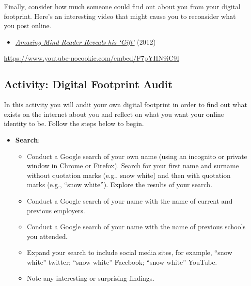 \documentclass[
  letterpaper,
  DIV=11,
  numbers=noendperiod]{scrreprt}
\providecommand{\tightlist}{%
  \setlength{\itemsep}{0pt}\setlength{\parskip}{0pt}}\usepackage{longtable,booktabs,array}
\begin{document}
\begin{tcolorbox}
Finally, consider how much someone could find out about you from your
digital footprint. Here's an interesting video that might cause you to
reconsider what you post online.

\begin{itemize}
\tightlist
\item
  \href{https://www.youtube.com/watch?v=F7pYHN9iC9I}{\emph{Amazing Mind
  Reader Reveals his `Gift'}} (2012)
\end{itemize}

\url{https://www.youtube-nocookie.com/embed/F7pYHN9iC9I}

\end{tcolorbox}

\subsection{Activity: Digital Footprint
Audit}\label{activity-digital-footprint-audit}

\begin{tcolorbox}[enhanced jigsaw, toprule=.15mm, colback=white, colframe=quarto-callout-note-color-frame, bottomtitle=1mm, leftrule=.75mm, coltitle=black, titlerule=0mm, rightrule=.15mm, colbacktitle=quarto-callout-note-color!10!white, left=2mm, title={Learning Activity}, opacitybacktitle=0.6, opacityback=0, breakable, toptitle=1mm, arc=.35mm, bottomrule=.15mm]

In this activity you will audit your own digital footprint in order to
find out what exists on the internet about you and reflect on what you
want your online identity to be. Follow the steps below to begin.

\begin{itemize}
\tightlist
\item
  \textbf{Search}:

  \begin{itemize}
  \tightlist
  \item
    Conduct a Google search of your own name (using an incognito or
    private window in Chrome or Firefox). Search for your first name and
    surname without quotation marks (e.g., snow white) and then with
    quotation marks (e.g., ``snow white''). Explore the results of your
    search.
  \item
    Conduct a Google search of your name with the name of current and
    previous employers.
  \item
    Conduct a Google search of your name with the name of previous
    schools you attended.
  \item
    Expand your search to include social media sites, for example,
    ``snow white'' twitter; ``snow white'' Facebook; ``snow white''
    YouTube.
  \item
    Note any interesting or surprising findings.
  \end{itemize}
\end{itemize}

\end{tcolorbox}
\end{document}
